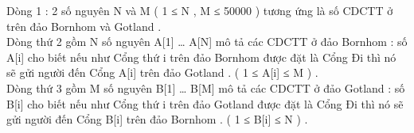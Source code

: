 Dòng 1 : 2 số nguyên N và M ( 1 ≤ N , M ≤ 50000 ) tương ứng là số CDCTT ở trên đảo Bornhom và Gotland .
\\Dòng thứ 2 gồm N số nguyên A[1] … A[N] mô tả các CDCTT ở đảo Bornhom : số A[i] cho biết nếu như Cổng thứ i trên đảo Bornhom được đặt là Cổng Đi thì nó sẽ gửi người đến Cổng A[i] trên đảo Gotland . ( 1 ≤ A[i] ≤ M ) .
\\Dòng thứ 3 gồm M số nguyên B[1] … B[M] mô tả các CDCTT ở đảo Gotland : số B[i] cho biết nếu như Cổng thứ i trên đảo Gotland được đặt là Cổng Đi thì nó sẽ gửi người đến Cổng B[i] trên đảo Bornhom . ( 1 ≤ B[i] ≤ N ) .